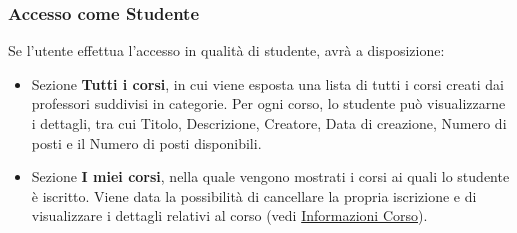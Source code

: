 \documentclass[11pt]{article}
\begin{document}
\subsubsection{Accesso come Studente}
\label{sec:org47fe1b1}
Se l'utente effettua l'accesso in qualità di studente, avrà a disposizione:
\begin{itemize}
\item Sezione \textbf{Tutti i corsi}, in cui viene esposta una lista di tutti i corsi creati dai professori suddivisi in categorie. Per ogni corso, lo studente può visualizzarne i dettagli, tra cui Titolo, Descrizione, Creatore, Data di creazione, Numero di posti e il Numero di posti disponibili.
\item Sezione \textbf{I miei corsi}, nella quale vengono mostrati i corsi ai quali lo studente è iscritto. Viene data la possibilità di cancellare la propria iscrizione e di visualizzare i dettagli relativi al corso (vedi \hyperref[orgfd1765d]{Informazioni Corso}).
\end{itemize}
\end{document}
